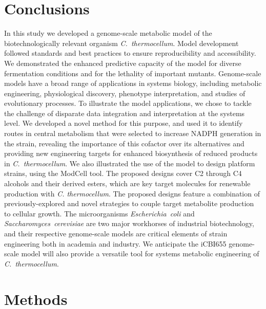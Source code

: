 \section{Conclusions}
In this study we developed a genome-scale metabolic model of the biotechnologically relevant organism \textit{C.~thermocellum}.
Model development followed standards and best practices to ensure reproducibility and accessibility.
We demonstrated the enhanced predictive capacity of the model for diverse fermentation conditions and for the lethality of important mutants.
Genome-scale models have a broad range of applications in systems biology, including metabolic engineering, physiological discovery, phenotype interpretation, and studies of evolutionary processes. \citep{feist2008, palsson2015} To illustrate the model applications, we chose to tackle the challenge of disparate data integration and interpretation at the systems level. We developed a novel method for this purpose, and used it to identify routes in central metabolism that were selected to increase NADPH generation in the  strain, revealing the importance of this cofactor over its alternatives and providing new engineering targets for enhanced biosynthesis of reduced products in \textit{C.~thermocellum}.
We also illustrated the use of the model to design platform strains, using the ModCell tool.\citep{garcia2019b} The proposed designs cover C2 through C4 alcohols and their derived esters, which are key target molecules for renewable production with \textit{C. thermocellum}.\citep{peters2018}
The proposed designs feature a combination of previously-explored and novel strategies to couple target metabolite production to cellular growth.
The microorganisms \textit{Escherichia~coli} and \textit{Saccharomyces~cerevisiae} are two major workhorses of industrial biotechnology, and their respective genome-scale models \citep{monk2017, lu2019} are critical elements of strain engineering both in academia\citep{blazeck2010} and industry.\citep{yim2011a}
We anticipate the iCBI655 genome-scale model will also provide a versatile tool for systems metabolic engineering of \textit{C.~thermocellum}.


\section{Methods}

